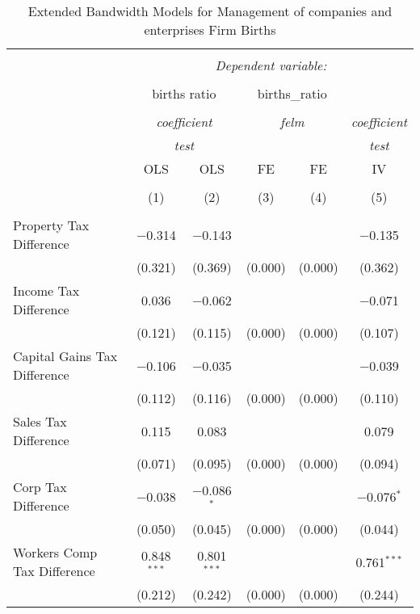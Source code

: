
\begin{table}[!htbp] \centering 
  \caption{Extended Bandwidth Models for  Management of companies and enterprises Firm Births} 
  \label{} 
\begin{tabular}{@{\extracolsep{5pt}}lccccc} 
\\[-1.8ex]\hline 
\hline \\[-1.8ex] 
 & \multicolumn{5}{c}{\textit{Dependent variable:}} \\ 
\cline{2-6} 
\\[-1.8ex] & \multicolumn{2}{c}{births ratio} & \multicolumn{2}{c}{births\_ratio} &   \\ 
\\[-1.8ex] & \multicolumn{2}{c}{\textit{coefficient}} & \multicolumn{2}{c}{\textit{felm}} & \textit{coefficient} \\ 
 & \multicolumn{2}{c}{\textit{test}} & \multicolumn{2}{c}{\textit{}} & \textit{test} \\ 
 & OLS & OLS & FE & FE & IV \\ 
\\[-1.8ex] & (1) & (2) & (3) & (4) & (5)\\ 
\hline \\[-1.8ex] 
 Property Tax Difference & $-$0.314 & $-$0.143 &  &  & $-$0.135 \\ 
  & (0.321) & (0.369) & (0.000) & (0.000) & (0.362) \\ 
  Income Tax Difference & 0.036 & $-$0.062 &  &  & $-$0.071 \\ 
  & (0.121) & (0.115) & (0.000) & (0.000) & (0.107) \\ 
  Capital Gains Tax Difference & $-$0.106 & $-$0.035 &  &  & $-$0.039 \\ 
  & (0.112) & (0.116) & (0.000) & (0.000) & (0.110) \\ 
  Sales Tax Difference & 0.115 & 0.083 &  &  & 0.079 \\ 
  & (0.071) & (0.095) & (0.000) & (0.000) & (0.094) \\ 
  Corp Tax Difference & $-$0.038 & $-$0.086$^{*}$ &  &  & $-$0.076$^{*}$ \\ 
  & (0.050) & (0.045) & (0.000) & (0.000) & (0.044) \\ 
  Workers Comp Tax Difference & 0.848$^{***}$ & 0.801$^{***}$ &  &  & 0.761$^{***}$ \\ 
  & (0.212) & (0.242) & (0.000) & (0.000) & (0.244) \\ 

\end{tabular}
\end{table}
